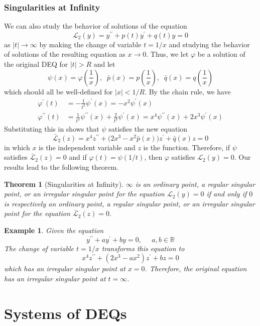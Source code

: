 \documentclass{article}
\newtheorem{theorem}{Theorem}[section]
\newtheorem{example}{Example}[section]
\theoremstyle{remark}
\theoremstyle{definition}
\begin{document}
\subsubsection{Singularities at Infinity}
We can also study the behavior of solutions of the equation
\[\mathcal{L}_2 (y) = y^{\prime\prime} + p(t) y^\prime + q(t) y = 0\]
as $|t| \rightarrow \infty$ by making the change of variable $t = 1/x$ and studying the behavior of solutions of the resulting equation as $x \rightarrow 0$. Thus, we let $\varphi$ be a solution of the original DEQ for $|t|>R$ and let
\[\psi(x) = \varphi(\frac{1}{x}), \;\; \bar{p}(x) = p(\frac{1}{x}), \;\; \bar{q}(x) = q(\frac{1}{x})\]
which should all be well-defined for $|x|<1/R$. By the chain rule, we have
\begin{align*}
    \varphi^\prime (t) & = -\frac{1}{t^2} \psi^\prime (x) = -x^2 \psi^\prime (x) \\
    \varphi^{\prime\prime} (t) & = \frac{1}{t^4} \psi^{\prime\prime} (x) + \frac{2}{t^3} \psi^\prime (x) = x^4 \psi^{\prime\prime}(x) + 2x^3 \psi^\prime (x) 
\end{align*}
Substituting this in shows that $\psi$ satisfies the new equation
\[\bar{\mathcal{L}}_2 (z) = x^4 z^{\prime\prime} + \big( 2x^3 - x^2 \bar{p}(x)\big) z^\prime + \bar{q} (x) z= 0\]
in which $x$ is the independent variable and $z$ is the function. Therefore, if $\psi$ satisfies $\bar{\mathcal{L}}_2 (z) = 0$ and if $\varphi(t) = \psi(1/t)$, then $\varphi$ satisfies $\mathcal{L}_2 (y) = 0$. Our results lead to the following theorem. 

\begin{theorem}[Singularities at Infinity]
$\infty$ is an ordinary point, a regular singular point, or an irregular singular point for the equation $\mathcal{L}_2 (y) = 0$ if and only if $0$ is respectively an ordinary point, a regular singular point, or an irregular singular point for the equation $\bar{\mathcal{L}}_2 (z) = 0$. 
\end{theorem}

\begin{example}
Given the equation
\[y^{\prime\prime} + a y^\prime + by = 0, \;\;\;\;\; a, b \in \mathbb{R}\]
The change of variable $t = 1/x$ transforms this equation to
\[x^4 z^{\prime\prime} + (2x^3 - ax^2) z^\prime + bz = 0\]
which has an irregular singular point at $x = 0$. Therefore, the original equation has an irregular singular point at $t = \infty$. 
\end{example}

\section{Systems of DEQs}
\end{document}
